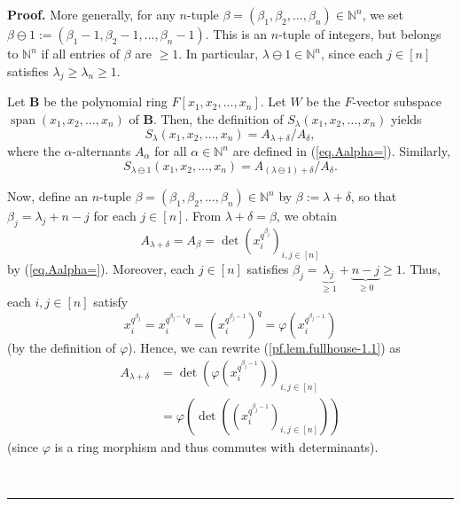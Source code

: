 \documentclass[numbers=enddot,12pt,final,onecolumn,notitlepage]{scrartcl}%
\numberwithin{exer}{section}
\theoremstyle{definition}
\newenvironment{proof}[1][Proof]{\noindent\textbf{#1.} }{\ \rule{0.5em}{0.5em}}
\theoremstyle{plainsl}
\begin{document}
\begin{proof}
More generally, for any $n$-tuple $\beta=\left(  \beta_{1},\beta_{2}%
,\ldots,\beta_{n}\right)  \in\mathbb{N}^{n}$, we set $\beta\ominus1:=\left(
\beta_{1}-1,\beta_{2}-1,\ldots,\beta_{n}-1\right)  $. This is an $n$-tuple of
integers, but belongs to $\mathbb{N}^{n}$ if all entries of $\beta$ are
$\geq1$. In particular, $\lambda\ominus1\in\mathbb{N}^{n}$, since each
$j\in\left[  n\right]  $ satisfies $\lambda_{j}\geq\lambda_{n}\geq1$.

Let $\mathbf{B}$ be the polynomial ring $F\left[  x_{1},x_{2},\ldots
,x_{n}\right]  $. Let $W$ be the $F$-vector subspace $\operatorname*{span}%
\left(  x_{1},x_{2},\ldots,x_{n}\right)  $ of $\mathbf{B}$. Then, the
definition of $S_{\lambda}\left(  x_{1},x_{2},\ldots,x_{n}\right)  $ yields
\begin{equation}
S_{\lambda}\left(  x_{1},x_{2},\ldots,x_{n}\right)  =A_{\lambda+\delta
}/A_{\delta}, \label{pf.lem.fullhouse-1.S1}%
\end{equation}
where the $\alpha$-alternants $A_{\alpha}$ for all $\alpha\in\mathbb{N}^{n}$
are defined in (\ref{eq.Aalpha=}). Similarly,%
\begin{equation}
S_{\lambda\ominus1}\left(  x_{1},x_{2},\ldots,x_{n}\right)  =A_{\left(
\lambda\ominus1\right)  +\delta}/A_{\delta}. \label{pf.lem.fullhouse-1.S2}%
\end{equation}


Now, define an $n$-tuple $\beta=\left(  \beta_{1},\beta_{2},\ldots,\beta
_{n}\right)  \in\mathbb{N}^{n}$ by $\beta:=\lambda+\delta$, so that $\beta
_{j}=\lambda_{j}+n-j$ for each $j\in\left[  n\right]  $. From $\lambda
+\delta=\beta$, we obtain%
\begin{equation}
A_{\lambda+\delta}=A_{\beta}=\det\left(  x_{i}^{q^{\beta_{j}}}\right)
_{i,j\in\left[  n\right]  } \label{pf.lem.fullhouse-1.1}%
\end{equation}
by (\ref{eq.Aalpha=}). Moreover, each $j\in\left[  n\right]  $ satisfies
$\beta_{j}=\underbrace{\lambda_{j}}_{\geq1}+\underbrace{n-j}_{\geq0}\geq1$.
Thus, each $i,j\in\left[  n\right]  $ satisfy%
\[
x_{i}^{q^{\beta_{j}}}=x_{i}^{q^{\beta_{j}-1}q}=\left(  x_{i}^{q^{\beta_{j}-1}%
}\right)  ^{q}=\varphi\left(  x_{i}^{q^{\beta_{j}-1}}\right)
\]
(by the definition of $\varphi$). Hence, we can rewrite
(\ref{pf.lem.fullhouse-1.1}) as
\begin{align}
A_{\lambda+\delta}  &  =\det\left(  \varphi\left(  x_{i}^{q^{\beta_{j}-1}%
}\right)  \right)  _{i,j\in\left[  n\right]  }\nonumber\\
&  =\varphi\left(  \det\left(  \left(  x_{i}^{q^{\beta_{j}-1}}\right)
_{i,j\in\left[  n\right]  }\right)  \right)  \label{pf.lem.fullhouse-1.2}%
\end{align}
(since $\varphi$ is a ring morphism and thus commutes with determinants).


\end{proof}
\end{document}
